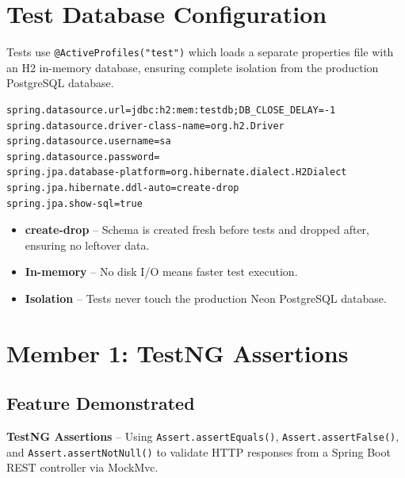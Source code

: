 \documentclass[12pt,a4paper]{article}
\begin{document}
\section{Test Database Configuration}

Tests use \texttt{@ActiveProfiles("test")} which loads a separate properties file with an H2 in-memory database, ensuring complete isolation from the production PostgreSQL database.

\begin{lstlisting}[style=bashstyle, caption={\texttt{application-test.properties} -- H2 test database}]
spring.datasource.url=jdbc:h2:mem:testdb;DB_CLOSE_DELAY=-1
spring.datasource.driver-class-name=org.h2.Driver
spring.datasource.username=sa
spring.datasource.password=
spring.jpa.database-platform=org.hibernate.dialect.H2Dialect
spring.jpa.hibernate.ddl-auto=create-drop
spring.jpa.show-sql=true
\end{lstlisting}

\begin{tcolorbox}[noteboxstyle, title=Why H2 for Tests?]
\begin{itemize}[nosep]
    \item \textbf{create-drop} -- Schema is created fresh before tests and dropped after, ensuring no leftover data.
    \item \textbf{In-memory} -- No disk I/O means faster test execution.
    \item \textbf{Isolation} -- Tests never touch the production Neon PostgreSQL database.
\end{itemize}
\end{tcolorbox}

\section{Member 1: TestNG Assertions}
\label{sec:member1}

\subsection{Feature Demonstrated}
\textbf{TestNG Assertions} -- Using \texttt{Assert.assertEquals()}, \texttt{Assert.assertFalse()}, and \texttt{Assert.assertNotNull()} to validate HTTP responses from a Spring Boot REST controller via MockMvc.
\end{document}
